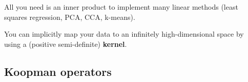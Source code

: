 \documentclass[a4paper,11pt]{exam}
\newcounter{ct}
\begin{document}
\begin{questions}
All you need is an inner product to implement many linear methods (least squares regression, PCA, CCA, k-means).

\begin{tcolorbox}[colback=black!1!,title=Kernel Trick]
You can implicitly map your data to an infinitely high-dimensional space by using a (positive semi-definite) \textbf{kernel}.
\end{tcolorbox}

\subsection{Koopman operators}

\end{questions}



\end{document}
